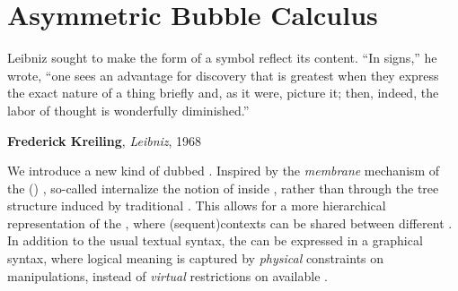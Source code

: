 \setchapterpreamble[u]{\margintoc}
\chapter{Asymmetric Bubble Calculus}

\epigraph{Leibniz sought to make the form of a symbol reflect its content. ``In
signs,'' he wrote, ``one sees an advantage for discovery that is greatest when
they express the exact nature of a thing briefly and, as it were, picture it;
then, indeed, the labor of thought is wonderfully diminished.''}
{\textbf{Frederick Kreiling}, \textit{Leibniz}, 1968}


\begin{scope}


We introduce a new kind of   dubbed
. Inspired by the \emph{membrane} mechanism of the
 (\intro{\cham})
, so-called \emph{} internalize
the notion of  inside , rather than through the tree
structure induced by traditional . This allows for a more
hierarchical representation of the , where
\kl(sequent){contexts} can be shared between different . In
addition to the usual textual syntax, the  can be expressed
in a graphical syntax, where logical meaning is captured by \emph{physical}
constraints on  manipulations, instead of \emph{virtual}
restrictions on available .



\end{scope}
